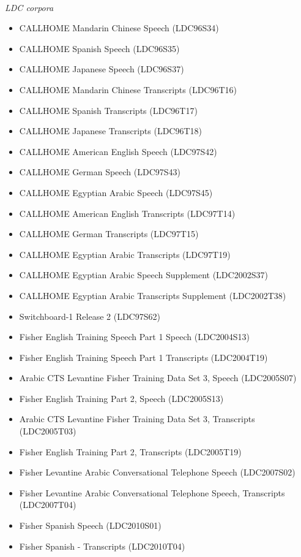 \documentclass{article}
\begin{document}
\begin{appendices}
\vspace{0.5cm}
 \\
{\it LDC corpora}
\begin{itemize}
    \item CALLHOME Mandarin Chinese Speech (LDC96S34)
    \item CALLHOME Spanish Speech (LDC96S35)
    \item CALLHOME Japanese Speech (LDC96S37)
    \item CALLHOME Mandarin Chinese Transcripts (LDC96T16)
    \item CALLHOME Spanish Transcripts (LDC96T17)
    \item CALLHOME Japanese Transcripts (LDC96T18)
    \item CALLHOME American English Speech (LDC97S42)
    \item CALLHOME German Speech (LDC97S43)
    \item CALLHOME Egyptian Arabic Speech (LDC97S45)
    \item CALLHOME American English Transcripts (LDC97T14)
    \item CALLHOME German Transcripts (LDC97T15)
    \item CALLHOME Egyptian Arabic Transcripts (LDC97T19)
    \item CALLHOME Egyptian Arabic Speech Supplement (LDC2002S37)
    \item CALLHOME Egyptian Arabic Transcripts Supplement (LDC2002T38)
    \item Switchboard-1 Release 2 (LDC97S62)
    \item Fisher English Training Speech Part 1 Speech (LDC2004S13)
    \item Fisher English Training Speech Part 1 Transcripts (LDC2004T19)
    \item Arabic CTS Levantine Fisher Training Data Set 3, Speech (LDC2005S07)
    \item Fisher English Training Part 2, Speech (LDC2005S13)
    \item Arabic CTS Levantine Fisher Training Data Set 3, Transcripts (LDC2005T03)
    \item Fisher English Training Part 2, Transcripts (LDC2005T19)
    \item Fisher Levantine Arabic Conversational Telephone Speech (LDC2007S02)
    \item Fisher Levantine Arabic Conversational Telephone Speech, Transcripts (LDC2007T04)
    \item Fisher Spanish Speech (LDC2010S01)
    \item Fisher Spanish - Transcripts (LDC2010T04)
\end{itemize}




\end{appendices}
\end{document}
